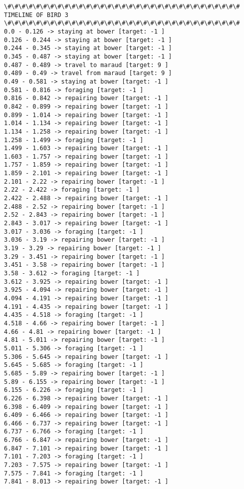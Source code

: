 \documentclass[11pt]{article}
\begin{document}
\begin{Verbatim}[commandchars=\\\{\}]
\#\#\#\#\#\#\#\#\#\#\#\#\#\#\#\#\#\#\#\#\#\#\#\#\#\#\#\#\#\#\#\#\#
TIMELINE OF BIRD 3
\#\#\#\#\#\#\#\#\#\#\#\#\#\#\#\#\#\#\#\#\#\#\#\#\#\#\#\#\#\#\#\#\#
0.0 - 0.126 -> staying at bower [target: -1 ]
0.126 - 0.244 -> staying at bower [target: -1 ]
0.244 - 0.345 -> staying at bower [target: -1 ]
0.345 - 0.487 -> staying at bower [target: -1 ]
0.487 - 0.489 -> travel to maraud [target: 9 ]
0.489 - 0.49 -> travel from maraud [target: 9 ]
0.49 - 0.581 -> staying at bower [target: -1 ]
0.581 - 0.816 -> foraging [target: -1 ]
0.816 - 0.842 -> repairing bower [target: -1 ]
0.842 - 0.899 -> repairing bower [target: -1 ]
0.899 - 1.014 -> repairing bower [target: -1 ]
1.014 - 1.134 -> repairing bower [target: -1 ]
1.134 - 1.258 -> repairing bower [target: -1 ]
1.258 - 1.499 -> foraging [target: -1 ]
1.499 - 1.603 -> repairing bower [target: -1 ]
1.603 - 1.757 -> repairing bower [target: -1 ]
1.757 - 1.859 -> repairing bower [target: -1 ]
1.859 - 2.101 -> repairing bower [target: -1 ]
2.101 - 2.22 -> repairing bower [target: -1 ]
2.22 - 2.422 -> foraging [target: -1 ]
2.422 - 2.488 -> repairing bower [target: -1 ]
2.488 - 2.52 -> repairing bower [target: -1 ]
2.52 - 2.843 -> repairing bower [target: -1 ]
2.843 - 3.017 -> repairing bower [target: -1 ]
3.017 - 3.036 -> foraging [target: -1 ]
3.036 - 3.19 -> repairing bower [target: -1 ]
3.19 - 3.29 -> repairing bower [target: -1 ]
3.29 - 3.451 -> repairing bower [target: -1 ]
3.451 - 3.58 -> repairing bower [target: -1 ]
3.58 - 3.612 -> foraging [target: -1 ]
3.612 - 3.925 -> repairing bower [target: -1 ]
3.925 - 4.094 -> repairing bower [target: -1 ]
4.094 - 4.191 -> repairing bower [target: -1 ]
4.191 - 4.435 -> repairing bower [target: -1 ]
4.435 - 4.518 -> foraging [target: -1 ]
4.518 - 4.66 -> repairing bower [target: -1 ]
4.66 - 4.81 -> repairing bower [target: -1 ]
4.81 - 5.011 -> repairing bower [target: -1 ]
5.011 - 5.306 -> foraging [target: -1 ]
5.306 - 5.645 -> repairing bower [target: -1 ]
5.645 - 5.685 -> foraging [target: -1 ]
5.685 - 5.89 -> repairing bower [target: -1 ]
5.89 - 6.155 -> repairing bower [target: -1 ]
6.155 - 6.226 -> foraging [target: -1 ]
6.226 - 6.398 -> repairing bower [target: -1 ]
6.398 - 6.409 -> repairing bower [target: -1 ]
6.409 - 6.466 -> repairing bower [target: -1 ]
6.466 - 6.737 -> repairing bower [target: -1 ]
6.737 - 6.766 -> foraging [target: -1 ]
6.766 - 6.847 -> repairing bower [target: -1 ]
6.847 - 7.101 -> repairing bower [target: -1 ]
7.101 - 7.203 -> foraging [target: -1 ]
7.203 - 7.575 -> repairing bower [target: -1 ]
7.575 - 7.841 -> foraging [target: -1 ]
7.841 - 8.013 -> repairing bower [target: -1 ]

\end{Verbatim}
\end{document}
